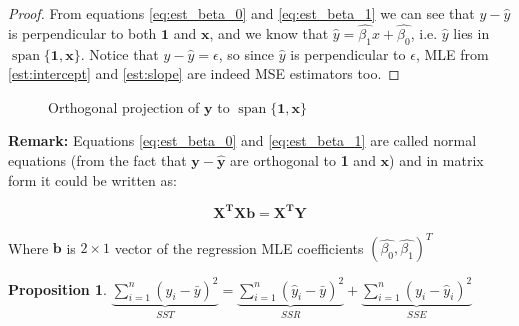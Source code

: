 \documentclass[12pt,a4paper,oneside]{book} %
\DeclareMathOperator{\spn}{span}
\newtheorem{proposition}[theorem]{Proposition}
\begin{document}
\begin{proof}
	From equations \ref{eq:est_beta_0} and \ref{eq:est_beta_1} we can see that $y-\hat{y}$ is perpendicular to both $\mathbf{1}$ and $\mathbf{x}$, and we know that $\hat{y}=\hat{\beta_1}x+\hat{\beta_0}$, i.e. $\hat{y}$ lies in $\spn \{ \mathbf{1}, \mathbf{x} \}$.
	Notice that $y-\hat{y}=\epsilon$, so since $\hat{y}$ is perpendicular to $\epsilon$, MLE from \ref{est:intercept} and \ref{est:slope} are indeed MSE estimators too.
\end{proof}


\begin{figure}
	\centering
	\caption{Orthogonal projection of $\mathbf{y}$ to $\spn \{ \mathbf{1,x} \}$}
	\label{fig:projection}
\end{figure}%




\textbf{Remark:} Equations \ref{eq:est_beta_0} and \ref{eq:est_beta_1} are called normal equations \cite{neter1983applied} (from the fact that $\mathbf{y-\hat{y}}$ are orthogonal to \textbf{1} and $\mathbf{x}$) and in matrix form it could be written as:

\begin{equation} \label{eq:matrix_form_ols}
	\mathbf{X^TXb = X^TY}
\end{equation}

Where $\mathbf{b}$ is $2 \times 1 $ vector of the regression MLE coefficients $(\hat{\beta_0}, \hat{\beta_1})^T$ 


\begin{proposition} \label{prop:sst_equation}
	$\underbrace{\sum_{i=1}^{n} (y_i - \bar{y})^2}_{SST} = \underbrace{\sum_{i=1}^{n} (\hat{y}_i - \bar{y})^2}_{SSR} + \underbrace{\sum_{i=1}^{n} (y_i - \hat{y}_i)^2}_{SSE}$
\end{proposition}
\end{document}
